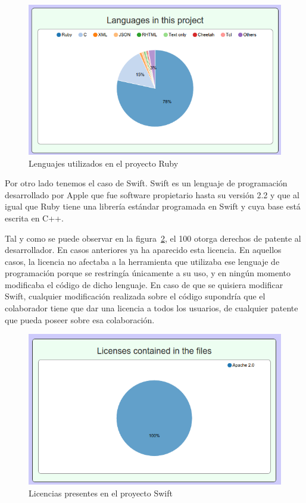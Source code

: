\documentclass[a4paper, spanish, 12pt]{book}
\begin{document}
\begin{figure}
	\centering
	\includegraphics[width=14cm, keepaspectratio]{img/languages_ruby}
	\caption{Lenguajes utilizados en el proyecto Ruby}
	\label{fig:ruby_lang}
\end{figure}

Por otro lado tenemos el caso de Swift. Swift es un lenguaje de programaci\'on desarrollado por Apple que fue software
propietario hasta su versi\'on 2.2 y que al igual que Ruby tiene una librer\'ia est\'andar programada en Swift y cuya
base est\'a escrita en C++.

Tal y como se puede observar en la figura~\ref{fig:swift_license}, el 100%
otorga derechos de patente al desarrollador. En casos anteriores ya ha aparecido esta licencia. En aquellos casos,
la licencia no afectaba a la herramienta que utilizaba ese lenguaje de programaci\'on porque
se restring\'ia \'unicamente a su uso, y en ning\'un momento modificaba el c\'odigo de dicho lenguaje.
En caso de que se quisiera modificar Swift, cualquier modificaci\'on realizada sobre el c\'odigo supondr\'ia que
el colaborador tiene que dar una licencia a todos los usuarios, de cualquier patente que pueda poseer sobre esa
colaboraci\'on.

\begin{figure}
	\centering
	\includegraphics[width=14cm, keepaspectratio]{img/licenses_swift}
	\caption{Licencias presentes en el proyecto Swift}
	\label{fig:swift_license}
\end{figure}
\end{document}
